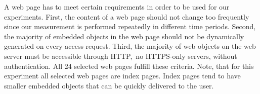 
A web page has to meet certain requirements in order to be used for our experiments.  
First, the content of a web page should not change too
frequently since our measurement is performed repeatedly in different time
periods. Second, the majority of embedded objects in the web page should not be
dynamically generated on every access request. Third, the majority of web
objects on the web server must be accessible through HTTP,~\ie no HTTPS-only
servers, without authentication. All 24 selected web pages fulfill these criteria. 
Note, that for this experiment all selected web pages are index pages. 
Index pages tend to have smaller embedded objects that can be quickly delivered to the user. 


